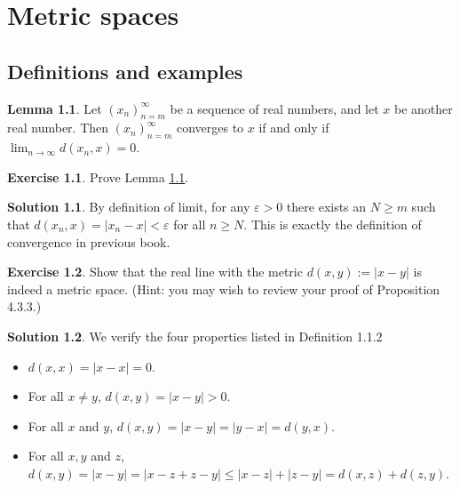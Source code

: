 \documentclass[13pt,a4paper]{report}
\theoremstyle{definition}
\newtheorem{lemma}{Lemma}[section]
\newtheorem{exercise}{Exercise}[section]
\newtheorem{solution}{Solution}[section]
\begin{document}
\chapter{Metric spaces}
\section{Definitions and examples}

\begin{lemma}\label{convergence_lemma_1}
Let $(x_n)^\infty_{n=m}$ be a sequence of real numbers, and let $x$ be another real number. Then
$(x_n)^\infty_{n=m}$ converges to $x$ if and only if $\lim_{n \rightarrow \infty}
d(x_n, x) = 0$.
\end{lemma}

\begin{exercise}
Prove Lemma \ref{convergence_lemma_1}.
\end{exercise}

\begin{solution}
By definition of limit, for any $\varepsilon > 0$ there exists an $N \ge m$ such that
$d(x_n, x) = |x_n - x| < \varepsilon$ for all $n \ge N$. This is exactly the definition
of convergence in previous book.
\end{solution}

\begin{exercise}
Show that the real line with the metric $d(x, y) := |x - y|$ is indeed a metric space.
(Hint: you may wish to review your proof of Proposition 4.3.3.)
\end{exercise}

\begin{solution} We verify the four properties listed in Definition 1.1.2
\begin{itemize}
    \item[1.] $d(x, x) = |x - x| = 0$.
    \item[2.] For all $x \ne y$, $d(x, y) = |x - y| > 0$.
    \item[3.] For all $x$ and $y$, $d(x, y) = |x - y| = |y - x| = d(y, x)$.
    \item[4.] For all $x, y$ and $z$, $d(x, y) = |x - y| = |x - z + z - y| \le
    |x - z| + |z - y| = d(x, z) + d(z, y)$.
\end{itemize}
\end{solution}
\end{document}
